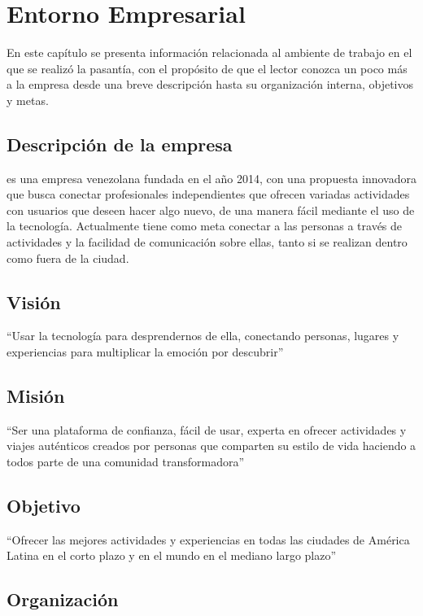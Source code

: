 \chapter{Entorno Empresarial}

En este capítulo se presenta información relacionada al ambiente de trabajo en el que se realizó la pasantía, con el propósito de que el lector conozca un poco más a la empresa \business desde una breve descripción hasta su organización interna, objetivos y metas.

\section{Descripción de la empresa}

\business es una empresa venezolana fundada en el año 2014, con una propuesta innovadora que busca conectar profesionales independientes que ofrecen variadas actividades con usuarios que deseen hacer algo nuevo, de una manera fácil mediante el uso de la tecnología. Actualmente tiene como meta conectar a las personas a través de actividades y la facilidad de comunicación sobre ellas, tanto si se realizan dentro como fuera de la ciudad.

\section{Visión}

``Usar la tecnología para desprendernos de ella, conectando personas, lugares y experiencias para multiplicar la emoción por descubrir''

\section{Misión}

``Ser una plataforma de confianza, fácil de usar, experta en ofrecer actividades y viajes auténticos creados por personas que comparten su estilo de vida haciendo a todos parte de una comunidad transformadora''

\section{Objetivo}

``Ofrecer las mejores actividades y experiencias en todas las ciudades de América Latina en el corto plazo y en el mundo en el mediano largo plazo''

\section{Organización}

